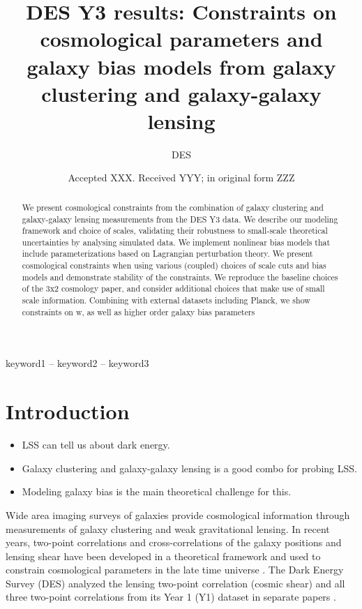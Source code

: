 \documentclass[fleqn,usenatbib]{mnras}
\title[Short title, max. 45 characters]{DES Y3 results: Constraints on cosmological parameters and galaxy bias models from galaxy clustering and galaxy-galaxy lensing}
\author[DES et al.]{
DES
}
\date{Accepted XXX. Received YYY; in original form ZZZ}
\begin{document}
\label{firstpage}
\pagerange{\pageref{firstpage}--\pageref{lastpage}}
\maketitle

\begin{abstract}
We present cosmological constraints from the combination of galaxy clustering and galaxy-galaxy lensing measurements from the DES Y3 data. We describe our modeling framework and choice of scales, validating their robustness to small-scale theoretical uncertainties by analysing simulated data. We implement nonlinear bias models that include parameterizations based on Lagrangian perturbation theory. We present cosmological constraints when using various (coupled) choices of scale cuts and bias models and demonstrate stability of the constraints. We reproduce the baseline choices of the 3x2 cosmology paper, and consider additional choices that make use of small scale information.  Combining with external datasets including Planck, we show constraints on w, as well as higher order galaxy bias parameters
\end{abstract}

\begin{keywords}
keyword1 -- keyword2 -- keyword3
\end{keywords}



\section{Introduction}
\label{sec:intro}
\begin{itemize}
    \item LSS can tell us about dark energy.
    \item Galaxy clustering and galaxy-galaxy lensing is a good combo for probing LSS.
    \item Modeling galaxy bias is the main theoretical challenge for this.
\end{itemize}

Wide area imaging surveys of galaxies provide cosmological information through measurements of galaxy clustering and weak gravitational lensing. In recent years, two-point correlations and cross-correlations of the galaxy positions and lensing shear have been developed in a theoretical framework \citep{Cacciato_2009,Baldauf_2010,Cacciato_2012,van_den_Bosch_2013} and used to constrain cosmological parameters in the late time universe \citep{Cacciato_2013,Mandelbaum_2013,Kwan_2016,More_2015,Dvornik_2018,Coupon_2015}. The Dark Energy Survey (DES) analyzed the lensing two-point correlation (cosmic shear) and all three two-point correlations from its Year 1 (Y1) dataset in separate papers \citep{Abbott_2018,Troxel_2018}. 
\end{document}
